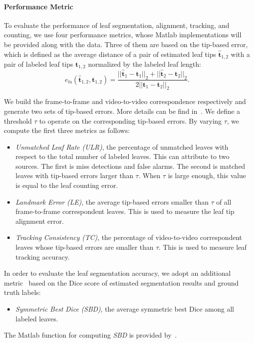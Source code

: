 \paragraph{Performance Metric}
To evaluate the performance of leaf segmentation, alignment, tracking, and counting, we use four performance metrics, whose Matlab implementations will be provided along with the data.
Three of them are based on the tip-based error, which is defined as the average distance of a pair of estimated leaf tips $\hat{\bm{t}}_{1,2}$ with a pair of labeled leaf tips $ \bm{t}_{1,2}$ normalized by the labeled leaf length:
\begin {equation}
e_{la}(\hat{\bm{t}}_{1,2}, \bm{t}_{1,2}) = \frac{||\hat{\bm{t}}_1-{\bm{t}}_1||_2 + ||\hat{\bm{t}}_2-{\bm{t}}_2||_2}{2 ||\bm{t}_1-\bm{t}_2||_2}.
\label{eqn:tipError}
\end{equation}

We build the frame-to-frame and video-to-video correspondence respectively and generate two sets of tip-based errors.
More details can be find in~\cite{yin2015}.
We define a threshold $\tau$ to operate on the corresponding tip-based errors.
By varying $\tau$, we compute the first three metrics as follows:
\begin{itemize}
\item {\it{Unmatched Leaf Rate (ULR)}}, the percentage of unmatched leaves with respect to the total number of labeled leaves.
This can attribute to two sources.
The first is miss detections and false alarms.
The second is matched leaves with tip-based errors larger than $\tau$.
When $\tau$ is large enough, this value is equal to the leaf counting error.
\item {\it{Landmark Error (LE)}}, the average tip-based errors smaller than $\tau$ of all frame-to-frame correspondent leaves.
This is used to measure the leaf tip alignment error.
\item {\it{Tracking Consistency (TC)}}, the percentage of video-to-video correspondent leaves whose tip-based errors are smaller than $\tau$.
This is used to measure leaf tracking accuracy.
\end{itemize}

In order to evaluate the leaf segmentation accuracy, we adopt an additional metric~\cite{scharr2014annotated} based on the Dice score of estimated segmentation results and ground truth labels:
\begin{itemize}
\item {\it{Symmetric Best Dice (SBD)}}, the average symmetric best Dice among all labeled leaves.
\end{itemize}
The Matlab function for computing {\it{SBD}} is provided by~\cite{scharr2014annotated}.


